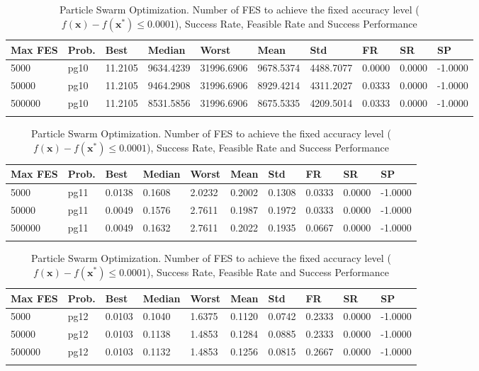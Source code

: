 \documentclass[10pt, a4paper]{book}
\begin{document}
\begin{center}
\begin{longtable}{l l l l l l l l l l}
\textbf{Max FES} & \textbf{Prob.} & \textbf{Best} & \textbf{Median} & \textbf{Worst} & \textbf{Mean} & \textbf{Std} & \textbf{FR} & \textbf{SR} & \textbf{SP} \\
\hline
5000 & pg10 & 11.2105 & 9634.4239 & 31996.6906 & 9678.5374 & 4488.7077 & 0.0000 & 0.0000 & -1.0000 \\
50000 & pg10 & 11.2105 & 9464.2908 & 31996.6906 & 8929.4214 & 4311.2027 & 0.0333 & 0.0000 & -1.0000 \\
500000 & pg10 & 11.2105 & 8531.5856 & 31996.6906 & 8675.5335 & 4209.5014 & 0.0333 & 0.0000 & -1.0000 \\

\caption{ Particle Swarm Optimization. Number of FES to achieve the fixed accuracy level ($f(\mathbf{x}) - f(\mathbf{x}^{*}) \leq 0.0001$), Success Rate, Feasible Rate and Success Performance }
\end{longtable}
\end{center}

\begin{center}
\begin{longtable}{l l l l l l l l l l}
\textbf{Max FES} & \textbf{Prob.} & \textbf{Best} & \textbf{Median} & \textbf{Worst} & \textbf{Mean} & \textbf{Std} & \textbf{FR} & \textbf{SR} & \textbf{SP} \\
\hline
5000 & pg11 & 0.0138 & 0.1608 & 2.0232 & 0.2002 & 0.1308 & 0.0333 & 0.0000 & -1.0000 \\
50000 & pg11 & 0.0049 & 0.1576 & 2.7611 & 0.1987 & 0.1972 & 0.0333 & 0.0000 & -1.0000 \\
500000 & pg11 & 0.0049 & 0.1632 & 2.7611 & 0.2022 & 0.1935 & 0.0667 & 0.0000 & -1.0000 \\

\caption{ Particle Swarm Optimization. Number of FES to achieve the fixed accuracy level ($f(\mathbf{x}) - f(\mathbf{x}^{*}) \leq 0.0001$), Success Rate, Feasible Rate and Success Performance }
\end{longtable}
\end{center}

\begin{center}
\begin{longtable}{l l l l l l l l l l}
\textbf{Max FES} & \textbf{Prob.} & \textbf{Best} & \textbf{Median} & \textbf{Worst} & \textbf{Mean} & \textbf{Std} & \textbf{FR} & \textbf{SR} & \textbf{SP} \\
\hline
5000 & pg12 & 0.0103 & 0.1040 & 1.6375 & 0.1120 & 0.0742 & 0.2333 & 0.0000 & -1.0000 \\
50000 & pg12 & 0.0103 & 0.1138 & 1.4853 & 0.1284 & 0.0885 & 0.2333 & 0.0000 & -1.0000 \\
500000 & pg12 & 0.0103 & 0.1132 & 1.4853 & 0.1256 & 0.0815 & 0.2667 & 0.0000 & -1.0000 \\

\caption{ Particle Swarm Optimization. Number of FES to achieve the fixed accuracy level ($f(\mathbf{x}) - f(\mathbf{x}^{*}) \leq 0.0001$), Success Rate, Feasible Rate and Success Performance }
\end{longtable}
\end{center}
\end{document}
